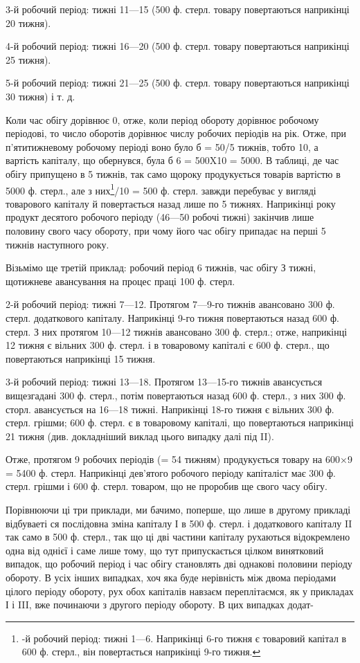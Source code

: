 3-й робочий період: тижні 11—15 (500 ф. стерл. товару повертаються
наприкінці 20 тижня).

4-й робочий період: тижні 16—20 (500 ф. стерл. товару повертаються
наприкінці 25 тижня).

5-й робочий період: тижні 21—25 (500 ф. стерл. товару повертаються
наприкінці 30 тижня) і т. д.

Коли час обігу дорівнює 0, отже, коли період обороту дорівнює
робочому періодові, то число оборотів дорівнює числу робочих періодів
на рік.
Отже, при п’ятитижневому робочому періоді воно було б = 50/5
тижнів, тобто 10, а вартість капіталу, що обернувся, була б 6 = 500X10 =
5000.
В таблиці, де час обігу припущено в 5 тижнів, так само щороку
продукується товарів вартістю в 5000 ф. стерл., але з них\footnote{
-й робочий період: тижні 1—6. Наприкінці 6-го тижня є товаровий
капітал в 600 ф. стерл., він повертається наприкінці 9-го тижня.
}/10 = 500 ф.
стерл. завжди перебуває у вигляді товарового капіталу й повертається
назад лише по 5 тижнях. Наприкінці року продукт десятого робочого
періоду (46—50 робочі тижні) закінчив лише половину свого часу
обороту, при чому його час обігу припадає на перші 5 тижнів наступного року.

Візьмімо ще третій приклад: робочий період 6 тижнів, час обігу
З тижні, щотижневе авансування на процес праці 100 ф. стерл.

2-й робочий період: тижні 7—12. Протягом 7—9-го тижнів авансовано
300 ф. стерл. додаткового капіталу. Наприкінці 9-го тижня повертаються
назад 600 ф. стерл. З них протягом 10—12 тижнів авансовано 300 ф.
стерл.; отже, наприкінці 12 тижня є вільних 300 ф. стерл. і в товаровому
капіталі є 600 ф. стерл., що повертаються наприкінці 15 тижня.

3-й робочий період: тижні 13—18. Протягом 13—15-го тижнів авансується
вищезгадані 300 ф. стерл., потім повертаються назад 600 ф. стерл.,
з них 300 ф. сторл. авансується на 16—18 тижні. Наприкінці 18-го тижня
є вільних 300 ф. стерл. грішми; 600 ф. стерл. є в товаровому капіталі,
що повертаються наприкінці 21 тижня (див. докладніший виклад
цього випадку далі під II).

Отже, протягом 9 робочих періодів (= 54 тижням) продукується товару
на 600×9 = 5400 ф. стерл. Наприкінці дев’ятого робочого періоду
капіталіст має 300 ф. стерл. грішми і 600 ф. стерл. товаром, що не
проробив ще свого часу обігу.

Порівнюючи ці три приклади, ми бачимо, поперше, що лише в другому
прикладі відбуваеті ся послідовна зміна капіталу І в 500 ф. стерл.
і додаткового капіталу II так само в 500 ф. стерл., так що ці дві частини
капіталу рухаються відокремлено одна від однієї і саме лише тому, що
тут припускається цілком винятковий випадок, що робочий період і час
обігу становлять дві однакові половини періоду обороту. В усіх інших
випадках, хоч яка буде нерівність між двома періодами цілого періоду
обороту, рух обох капіталів навзаєм переплітаємся, як у прикладах
І і III, вже починаючи з другого періоду обороту. В цих випадках додат-
